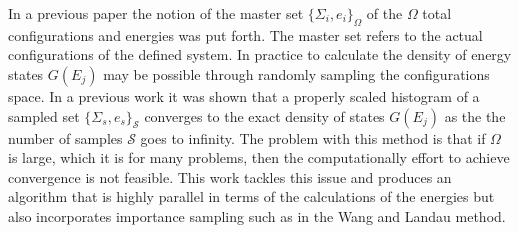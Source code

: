 \documentclass[twocolumn]{article}
\begin{document}
In a previous paper the notion of the master set $\{ \Sigma_i, e_i \}_\Omega $ of the $\Omega$ total configurations and energies was put forth. The master set refers to the actual configurations of the defined system. In practice to calculate the density of energy states $G(E_j)$  may be possible through randomly sampling the configurations space.  In a previous work it was shown that a properly scaled histogram of a sampled set $\{ \Sigma_s, e_s \}_\mathcal{S}$ converges to the exact density of states $G(E_j)$ as the the number of samples $\mathcal{S}$ goes to infinity. The problem with this method is that if $\Omega$ is large, which it is for many problems,  then the computationally effort to achieve convergence is not feasible.  This work tackles this issue and produces an algorithm that is highly parallel in terms of the calculations of the energies  but also incorporates importance sampling such as in the Wang and Landau method. 
\end{document}
